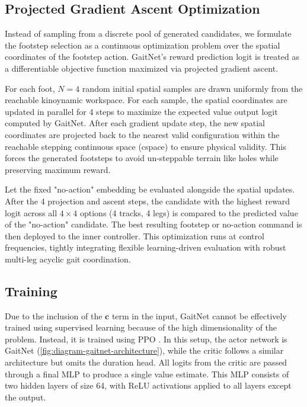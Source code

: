 \subsection{Projected Gradient Ascent Optimization}
\label{subsec:methodology-gaitnet-gradient-ascent}

Instead of sampling from a discrete pool of generated candidates, we formulate
the footstep selection as a continuous optimization problem over the spatial
coordinates of the footstep action. GaitNet's reward prediction logit is treated
as a differentiable objective function maximized via projected gradient ascent.

For each foot, $N=4$ random initial spatial samples are drawn uniformly from the 
reachable kinoynamic workspace. For each sample, the spatial coordinates are updated 
in parallel for 4 steps to maximize the expected value output logit computed by GaitNet. 
After each gradient update step, the new spatial coordinates are projected back to the 
nearest valid configuration within the reachable stepping continuous space (cspace) 
to ensure physical validity. This forces the generated footsteps to avoid un-steppable 
terrain like holes while preserving maximum reward.

Let the fixed "no-action" embedding be evaluated alongside the spatial updates. 
After the 4 projection and ascent steps, the candidate with the highest reward 
logit across all $4 \times 4$ options (4 tracks, 4 legs) is compared to the 
predicted value of the "no-action" candidate. The best resulting footstep or 
no-action command is then deployed to the inner controller. This optimization runs 
at control frequencies, tightly integrating flexible learning-driven evaluation 
with robust multi-leg acyclic gait coordination.

\subsection{Training}
\label{subsec:methodology-gaitnet-training}

Due to the inclusion of the $\mathbf{c}$ term in the input, GaitNet
cannot be effectively trained using supervised learning because of
the high dimensionality of the problem. Instead, it is trained using
PPO \cite{Schulman_proximal_2017}. In this setup, the actor network
is GaitNet (\autoref{fig:diagram-gaitnet-architecture}), while the
critic follows a similar architecture but omits the duration head.
All logits from the critic are passed through a final MLP to produce
a single value estimate. This MLP consists of two hidden layers of
size 64, with ReLU activations applied to all layers except the output.

